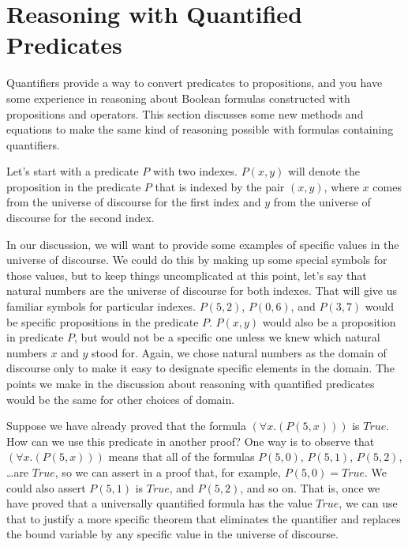 {{\begin{ExerciseList}
\end{ExerciseList}

\section{Reasoning with Quantified Predicates}
\label{sec:quantifier-equations}

Quantifiers provide a way to convert predicates to propositions,
and you have some experience in reasoning about Boolean formulas constructed with
propositions and operators.
This section discusses some new methods and equations to make
the same kind of reasoning possible with formulas containing quantifiers.

Let's start with a predicate $P$ with two indexes.
$P(x,y)$ will denote the proposition in the predicate $P$ that is indexed
by the pair $(x,y)$, where $x$ comes from the universe of discourse for the first index
and $y$ from the universe of discourse for the second index.

In our discussion, we will want to provide some examples
of specific values in the universe of discourse.
We could do this by making up some special symbols for those values,
but to keep things uncomplicated at this point,
let's say that natural numbers are the universe of discourse for both indexes.
That will give us familiar symbols for particular indexes.
$P(5,2)$, $P(0,6)$, and $P(3,7)$ would be specific propositions in the predicate $P$.
$P(x,y)$ would also be a proposition in predicate $P$, but would not be a specific one
unless we knew which natural numbers $x$ and $y$ stood for.
Again, we chose natural numbers as the domain of discourse
only to make it easy to designate specific elements in the domain.
The points we make in the discussion about reasoning with quantified predicates
would be the same for other choices of domain.

Suppose we have already proved that the formula $(\forall x.(P(5, x)))$ is $True$.
How can we use this predicate in another proof?
One way is to observe that $(\forall x.(P(5, x)))$ means that all of the formulas
$P(5, 0)$, $P(5, 1)$, $P(5, 2)$, \dots are $True$,
so we can assert in a proof that, for example,
$P(5, 0) = True$. We could also assert $P(5, 1)$ is $True$, and $P(5, 2)$, and so on.
That is, once we have proved that a universally quantified formula has the value $True$,
we can use that to justify a more specific theorem that
eliminates the quantifier and replaces the bound variable by any specific value
in the universe of discourse.

}}
